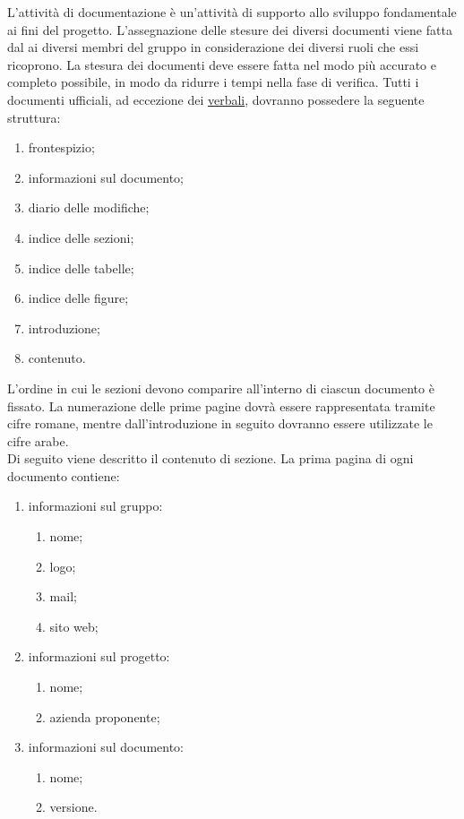 	L'attività di documentazione è un'attività di supporto allo sviluppo fondamentale ai fini del progetto.
	L'assegnazione delle stesure dei diversi documenti viene fatta dal  ai diversi membri del gruppo in considerazione dei diversi ruoli che essi ricoprono.
	La stesura dei documenti deve essere fatta nel modo più accurato e completo possibile, in modo da ridurre i tempi nella fase di verifica.
			Tutti i documenti ufficiali, ad eccezione dei \hyperref[sec:verbali]{verbali}, dovranno possedere la seguente struttura:
			\begin{enumerate}
				\item frontespizio;
				\item informazioni sul documento;
				\item diario delle modifiche;
				\item indice delle sezioni;
				\item indice delle tabelle;
				\item indice delle figure;
				\item introduzione;
				\item contenuto.
			\end{enumerate}
			L’ordine in cui le sezioni devono comparire all’interno di ciascun documento è fissato. La numerazione delle prime pagine dovrà essere rappresentata tramite cifre romane, mentre dall'introduzione in seguito dovranno essere utilizzate le cifre arabe. \\
			Di seguito viene descritto il contenuto di sezione.
				La prima pagina di ogni documento contiene:
				\begin{enumerate}
					\item informazioni sul gruppo:
					\begin{enumerate}
						\item nome;
						\item logo;
						\item mail;
						\item sito web;
					\end{enumerate}
					\item informazioni sul progetto:
					\begin{enumerate}
						\item nome;
						\item azienda proponente;
					\end{enumerate}
					\item informazioni sul documento:
					\begin{enumerate}
						\item nome;
						\item versione.
					\end{enumerate}
				\end{enumerate}
